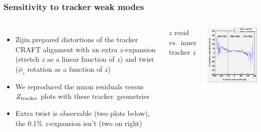 \documentclass[compress]{beamer}
\begin{document}
\begin{frame}
\frametitle{Sensitivity to tracker weak modes}

\vspace{0.2 cm}
\begin{columns}
\begin{itemize}
\item Zijin prepared distortions of the tracker CRAFT alignment with an extra
  \mbox{$z$-expansion\hspace{-0.5 cm}} (stretch $z$ as a linear function of $z$) and twist
  ($\phi_z$ rotation as a function of $z$)
\item We reproduced the muon residuals versus $Z_{\mbox{\scriptsize tracker}}$ plots with these \mbox{tracker geometries\hspace{-1 cm}}
\item Extra twist is observable (two plots below), the 0.1\% $z$-expansion isn't (two on right)
\end{itemize}

\scriptsize $z$ resid vs.\ inner tracker $z$

\includegraphics[width=\linewidth]{resid_from_tracker_inner_zexpand.png}
\end{columns}


\end{frame}
\end{document}
